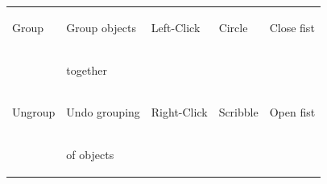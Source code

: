 \documentclass[runningheads,a4paper]{llncs}
\begin{document}
\begin{table}[t]
\begin{center}
\begin{tabular}{| l | l | l | l | l |}
  \begin{tiny}Group                \end{tiny}&\begin{tiny}Group objects        \end{tiny}&\begin{tiny}Left-Click     \end{tiny}&\begin{tiny}Circle        \end{tiny}&\begin{tiny}Close fist       \end{tiny}\vspace{-0.05in}\\
  \begin{tiny}                     \end{tiny}&\begin{tiny}together             \end{tiny}&\begin{tiny}               \end{tiny}&\begin{tiny}              \end{tiny}&\begin{tiny}                 \end{tiny}\vspace{-0.02in}\\ \hline
  \begin{tiny}Ungroup              \end{tiny}&\begin{tiny}Undo grouping        \end{tiny}&\begin{tiny}Right-Click    \end{tiny}&\begin{tiny}Scribble      \end{tiny}&\begin{tiny}Open fist        \end{tiny}\vspace{-0.05in}\\
  \begin{tiny}                     \end{tiny}&\begin{tiny}of objects           \end{tiny}&\begin{tiny}               \end{tiny}&\begin{tiny}              \end{tiny}&\begin{tiny}                 \end{tiny}\vspace{-0.02in}\\ \hline

\end{tabular}
\end{center}
\end{table}
\end{document}
